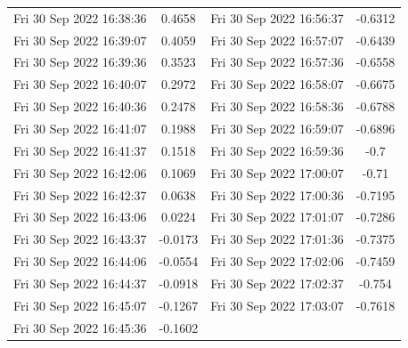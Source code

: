 \documentclass[12pt]{ctexart}
\numberwithin{equation}{section}
\begin{document}
\begin{longtable}{cc|cc}
Fri 30 Sep 2022 16:38:36 & 0.4658 & Fri 30 Sep 2022 16:56:37 & -0.6312\\
Fri 30 Sep 2022 16:39:07 & 0.4059 & Fri 30 Sep 2022 16:57:07 & -0.6439\\
Fri 30 Sep 2022 16:39:36 & 0.3523 & Fri 30 Sep 2022 16:57:36 & -0.6558\\
Fri 30 Sep 2022 16:40:07 & 0.2972 & Fri 30 Sep 2022 16:58:07 & -0.6675\\
Fri 30 Sep 2022 16:40:36 & 0.2478 & Fri 30 Sep 2022 16:58:36 & -0.6788\\
Fri 30 Sep 2022 16:41:07 & 0.1988 & Fri 30 Sep 2022 16:59:07 & -0.6896\\
Fri 30 Sep 2022 16:41:37 & 0.1518 & Fri 30 Sep 2022 16:59:36 & -0.7\\
Fri 30 Sep 2022 16:42:06 & 0.1069 & Fri 30 Sep 2022 17:00:07 & -0.71\\
Fri 30 Sep 2022 16:42:37 & 0.0638 & Fri 30 Sep 2022 17:00:36 & -0.7195\\
Fri 30 Sep 2022 16:43:06 & 0.0224 & Fri 30 Sep 2022 17:01:07 & -0.7286\\
Fri 30 Sep 2022 16:43:37 & -0.0173 & Fri 30 Sep 2022 17:01:36 & -0.7375\\
Fri 30 Sep 2022 16:44:06 & -0.0554 & Fri 30 Sep 2022 17:02:06 & -0.7459\\
Fri 30 Sep 2022 16:44:37 & -0.0918 & Fri 30 Sep 2022 17:02:37 & -0.754\\
Fri 30 Sep 2022 16:45:07 & -0.1267 & Fri 30 Sep 2022 17:03:07 & -0.7618\\
Fri 30 Sep 2022 16:45:36 & -0.1602\\
    \hline
\end{longtable}
\end{document}
